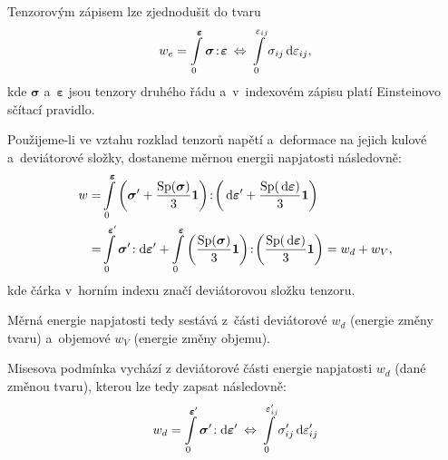 Tenzorovým zápisem lze zjednodušit do tvaru
\begin{equation}
	w_e
	= \int\limits_{0}^{\bm{\varepsilon}} \bm{\sigma} \!:\! \bm{\varepsilon} 
	\:\Leftrightarrow\: \int\limits_{0}^{\varepsilon_{ij}} \sigma_{ij} \,\mathrm{d} \varepsilon_{ij},
\end{equation}
kde $\bm{\sigma}$ a~$\bm{\varepsilon}$ jsou tenzory druhého řádu a~v~indexovém zápisu platí Einsteinovo sčítací pravidlo.

Použijeme-li ve vztahu rozklad tenzorů napětí a~deformace na jejich kulové a~deviátorové složky, dostaneme měrnou energii napjatosti následovně:
\begin{equation}\begin{split}%
	w
	= &\int\limits_0^{\bm{\varepsilon}} \left(\bm{\sigma}' + \frac{\mathrm{Sp}(\bm{\sigma})}{3}\bm{1}\right)
	\!:\! \left(\diff \bm{\varepsilon}' + \frac{\mathrm{Sp}(\diff \bm{\varepsilon})}{3}\bm{1}\right)\\
	= &\int\limits_0^{\bm{\varepsilon}'} \bm{\sigma}' \!:\! \diff \bm{\varepsilon}'
	+ \int\limits_0^{\bm{\varepsilon}} \left( \frac{\mathrm{Sp}(\bm{\sigma})}{3}\bm{1} \right) \!:\! \left( \frac{\mathrm{Sp}(\diff \bm{\varepsilon})}{3}\bm{1} \right)
	= w_d + w_V,
\end{split}\end{equation}
kde čárka v~horním indexu značí deviátorovou složku tenzoru.

Měrná energie napjatosti tedy sestává z~části deviátorové $w_d$ (energie změny tvaru) a~objemové $w_V$ (energie změny objemu).

Misesova podmínka vychází z deviátorové části energie napjatosti $w_d$ (dané změnou tvaru), kterou lze tedy zapsat následovně:
\begin{equation}
	w_d = \int\limits_0^{\bm{\varepsilon}'} \bm{\sigma}' \!:\! \,\mathrm{d} \bm{\varepsilon}' \:\Leftrightarrow\: \int\limits_0^{\varepsilon'_{ij}} \sigma'_{ij} \,\mathrm{d} \varepsilon'_{ij}
\end{equation}

